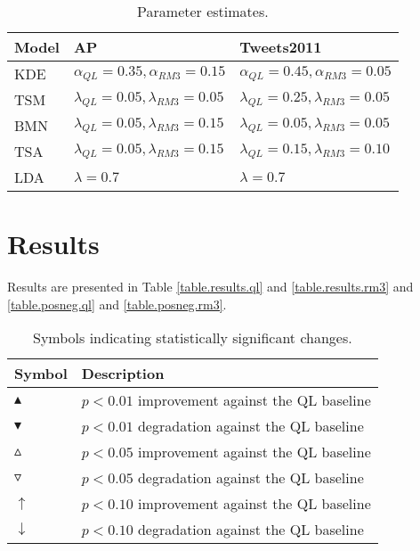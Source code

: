\documentclass{sig-alternate}
\begin{document}
\begin{table}[htdp]
\small
\caption{Parameter estimates. }
\begin{center}
\begin{tabular}{| l | l | l |}
\hline
\bf{Model}& \bf{AP} 								&  \bf{Tweets2011}\\ \hline 
KDE 	& $\alpha_{QL} = 0.35, \alpha_{RM3} = 0.15$ 		& $\alpha_{QL} = 0.45, \alpha_{RM3} = 0.05$ \\
TSM 	& $\lambda_{QL} = 0.05, \lambda_{RM3} = 0.05$ 	& $\lambda_{QL} = 0.25, \lambda_{RM3} = 0.05$ \\ 
BMN 	& $\lambda_{QL} = 0.05, \lambda_{RM3} = 0.15$ 	& $\lambda_{QL} = 0.05, \lambda_{RM3} = 0.05$ \\ 
TSA 		& $\lambda_{QL} = 0.05, \lambda_{RM3} = 0.15$ 	& $\lambda_{QL} = 0.15, \lambda_{RM3} = 0.10$ \\ 
LDA 		& $\lambda = 0.7$							& $\lambda = 0.7 $ \\ \hline
\end{tabular}
\end{center}
\label{table.params}
\normalsize
\end{table}


\section{Results}

Results are presented in Table \ref{table.results.ql} and \ref{table.results.rm3} and \ref{table.posneg.ql} and \ref{table.posneg.rm3}.

\begin{table}[htdp]
\small
\caption{Symbols indicating statistically significant changes. }
\begin{center}
\begin{tabular}{l | l }
\hline
\bf{Symbol}		& \bf{Description}\\ \hline 
$\blacktriangle$		&	$p < 0.01$ improvement against the QL baseline \\
$\blacktriangledown$	&	$p < 0.01$ degradation against the QL baseline \\
$\vartriangle$			&	$p < 0.05$ improvement against the QL baseline \\
$\triangledown$		&	$p < 0.05$ degradation against the QL baseline \\
$\uparrow$			&	$p < 0.10$ improvement against the QL baseline \\
$\downarrow$			&	$p < 0.10$ degradation against the QL baseline \\ \hline
\end{tabular}
\end{center}
\label{table.pval}
\normalsize
\end{table}
\end{document}
